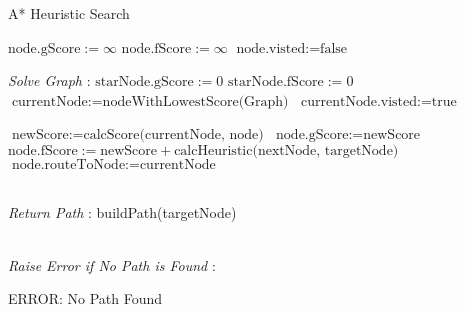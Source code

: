 \label{A*}
\begin{algorithm}
  \caption{A* Heuristic Search}
  \begin{algorithmic}[1]
    \STATE $\text{node.gScore} := \infty$
    \STATE $\text{node.fScore} := \infty$
    \STATE $\text{node.visted} := \text{false}$
   \ENDFOR

   \textit{Solve Graph} :
   \STATE $\text{starNode.gScore} := 0$
   \STATE $\text{starNode.fScore} := 0$
  \STATE $\text{currentNode} := \text{nodeWithLowestScore(Graph)}$
  \STATE $\text{currentNode.visted} := \text{true}$

    \STATE $\text{newScore} := \text{calcScore(currentNode, node)}$
    \STATE  $\text{node.gScore} := \text{newScore}$
    \STATE  $\text{node.fScore} := \text{newScore} + \text{calcHeuristic(nextNode, targetNode)}$
    \STATE  $\text{node.routeToNode} := \text{currentNode}$
    \ENDIF
    \ENDIF
    \ENDFOR
    
    \\ \textit{Return Path} :
    \RETURN build{Path(targetNode)}
    \ENDIF

    
    \\ \textit{Raise Error if No Path is Found} :

    \RETURN ERROR: No Path Found
    \ENDIF

   \ENDWHILE

  \end{algorithmic} 
  \end{algorithm}